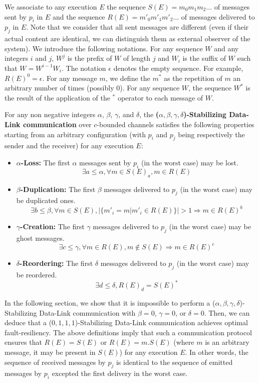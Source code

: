 \documentclass[11pt]{article}
\begin{document}
We associate to any execution $E$ the sequence $S(E)=m_0m_1m_2\ldots$ of messages sent by $p_i$ in $E$ and the sequence $R(E)=m'_0m'_1m'_2\ldots$ of messages delivered to $p_j$ in $E$. Note that we consider that all sent messages are different (even if their actual content are identical, we can distinguish them as external observer of the system). We introduce the following notations. For any sequence $W$ and any integers $i$ and $j$, $W^j$ is the prefix of $W$ of length $j$ and $W_i$ is the suffix of $W$ such that $W=W^{i-1}W_i$. The notation $\epsilon$ denotes the empty sequence. For example, $R(E)^0=\epsilon$. For any message $m$, we define the $m^*$ as the repetition of $m$ an arbitrary number of times (possibly 0). For any sequence $W$, the sequence $W^*$ is the result of the application of the $^*$ operator to each message of $W$. 

For any non negative integers $\alpha$, $\beta$, $\gamma$, and $\delta$, the \textbf{($\alpha,\beta,\gamma,\delta$)-Stabilizing Data-Link communication} over $c$-bounded channels satisfies the following properties starting from an arbitrary configuration (with $p_i$ and $p_j$ being respectively the sender and the receiver) for any execution $E$:
\begin{itemize}
\item \textbf{$\alpha$-Loss:} The first $\alpha$ messages sent by $p_i$ (in the worst case) may be lost.
\[\exists a\leq\alpha, \forall m\in S(E)_a, m\in R(E)\]
\item \textbf{$\beta$-Duplication:} The first $\beta$ messages delivered to $p_j$ (in the worst case) may be duplicated ones.
\[\exists b\leq\beta, \forall m\in S(E), \big|\{m'_i=m|m'_i\in R(E)\}\big|> 1\Rightarrow m\in R(E)^b\]
\item \textbf{$\gamma$-Creation:} The first $\gamma$ messages delivered to $p_j$ (in the worst case) may be ghost messages.
\[\exists c\leq\gamma, \forall m\in R(E), m\notin S(E)\Rightarrow m\in R(E)^c\]
\item \textbf{$\delta$-Reordering:} The first $\delta$ messages delivered to $p_j$ (in the worst case) may be reordered.
\[\exists d\leq \delta, R(E)_d=S(E)^*\]
\end{itemize}

In the following section, we show that it is impossible to perform a ($\alpha,\beta,\gamma,\delta$)-Stabilizing Data-Link communication with $\beta=0$, $\gamma=0$, or $\delta=0$. Then, we can deduce that a  ($0,1,1,1$)-Stabilizing Data-Link communication achieves optimal fault-resiliency. The above definitions imply that such a communication protocol ensures that $R(E)=S(E)$ or $R(E)=m.S(E)$ (where $m$ is an arbitrary message, it may be present in $S(E)$) for any execution $E$. In other words, the sequence of received messages by $p_j$ is identical to the sequence of emitted messages by $p_i$ excepted the first delivery in the worst case.
\end{document}
